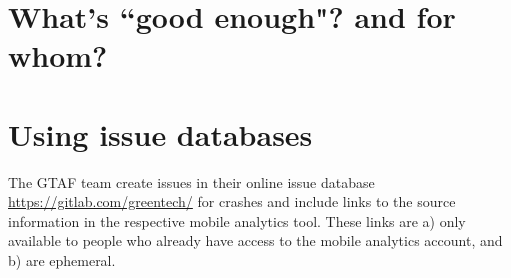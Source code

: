\section{What's ``good enough"? and for whom?}

\section{Using issue databases}
The GTAF team create issues in their online issue database \url{https://gitlab.com/greentech/} for crashes and include links to the source information in the respective mobile analytics tool. These links are a) only available to people who already have access to the mobile analytics account, and b) are ephemeral.

